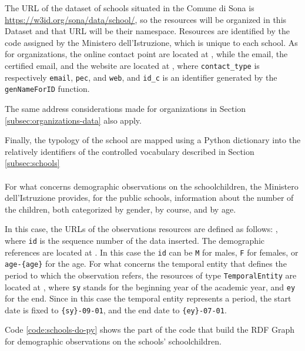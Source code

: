 The \ac{URL} of the dataset of schools situated in the Comune di Sona is \url{https://w3id.org/sona/data/school/}, so the resources will be organized in this Dataset and that \ac{URL} will be their namespace. Resources are identified by the code assigned by the Ministero dell'Istruzione, which is unique to each school. As for organizations, the online contact point are located at , while the email, the certified email, and the website are located at , where \verb#contact_type# is respectively \verb#email#, \verb#pec#, and \verb#web#, and \verb#id_c# is an identifier generated by the \verb#genNameForID# function.

The same address considerations made for organizations in Section \ref{subsec:organizations-data} also apply.

Finally, the typology of the school are mapped using a Python dictionary into the relatively identifiers of the controlled vocabulary described in Section \ref{subsec:schools}

\paragraph*{}
For what concerns demographic observations on the schoolchildren, the Ministero dell'Istruzione provides, for the public schools, information about the number of the children, both categorized by gender, by course, and by age.

In this case, the \acp{URL} of the observations resources are defined as follows: , where \verb#id# is the sequence number of the data inserted. The demographic references are located at . In this case the \verb#id# can be \verb#M# for males, \verb#F# for females, or \verb#age-{age}# for the age. For what concerns the temporal entity that defines the period to which the observation refers, the resources of type \verb#TemporalEntity# are located at , where \verb#sy# stands for the beginning year of the academic year, and \verb#ey# for the end. Since in this case the temporal entity represents a period, the start date is fixed to \verb#{sy}-09-01#, and the end date to \verb#{ey}-07-01#.

Code \ref{code:schools-do-py} shows the part of the code that build the \ac{RDF} Graph for demographic observations on the schools' schoolchildren.

